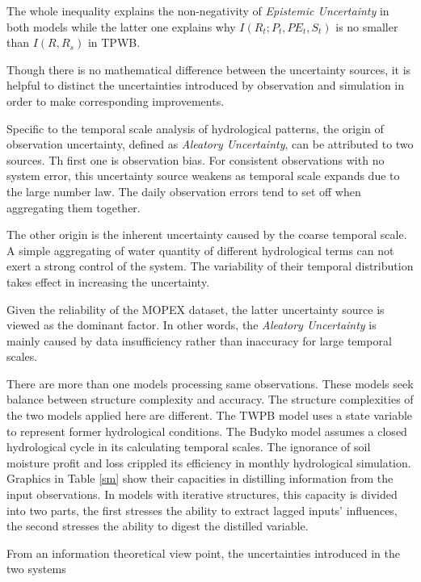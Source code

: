 \documentclass[review]{elsarticle}
\begin{document}
The whole inequality explains the non-negativity of \emph{Epistemic Uncertainty} in both models while the latter one explains why $I(R_t;P_t,PE_t,S_t)$ is no smaller than $I(R,R_s)$ in TPWB.

Though there is no mathematical difference between the uncertainty sources, it is helpful to distinct the uncertainties introduced by observation and simulation in order to make corresponding improvements\citep{gong2013estimating}. 

Specific to the temporal scale analysis of hydrological patterns, the origin of observation uncertainty, defined as \emph{Aleatory Uncertainty}, can be attributed to two sources. Th first one is  observation bias. For consistent observations with no system error, this uncertainty source  weakens as temporal scale expands  due to the large number law. The daily observation errors tend to set off when aggregating them together. 

The other origin is the inherent uncertainty caused by the coarse temporal scale. A simple aggregating of water quantity of different hydrological terms can not exert a strong control of the system. The variability of their temporal distribution takes effect in increasing the uncertainty. 

Given the reliability of the MOPEX dataset, the latter uncertainty source is viewed as the dominant factor. In other words, the \emph{Aleatory Uncertainty} is mainly caused by data insufficiency rather than inaccuracy for large temporal scales.

There are more than one models processing same observations. These models seek balance between structure complexity and accuracy. The structure complexities of the two models applied here are different. The TWPB model uses a state variable to represent former hydrological conditions. The Budyko model assumes a closed hydrological cycle in its calculating temporal scales. The ignorance of soil moisture profit and loss crippled its efficiency in monthly hydrological simulation. Graphics in Table \ref{sm} show their capacities in distilling information from the input observations. In models with iterative structures, this capacity is divided into two parts, the first stresses the ability to extract lagged inputs' influences, the second stresses the ability to digest the distilled variable. 






\iffalse
From an information theoretical view point, the uncertainties introduced in the two systems   
\end{document}
